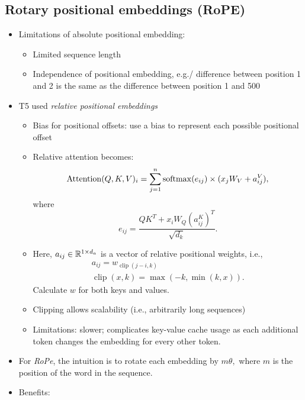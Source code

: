 \subsection{Rotary positional embeddings (RoPE)}
\begin{itemize}
	\item Limitations of absolute positional embedding:
	\begin{itemize}
		\item Limited sequence length
		\item Independence of positional embedding, e.g./ difference between position 1 and 2 is the same as the difference between position 1 and 500
	\end{itemize}
    \item T5 used \textit{relative positional embeddings}
    \begin{itemize}
        \item Bias for positional offsets: use a bias to represent each possible positional offset
        \item Relative attention becomes:
        \begin{equation*}
            \operatorname{Attention}(Q,K,V)_i = \sum_{j=1}^{n}\operatorname{softmax}(e_{ij}) \times (x_jW_V + a_{ij}^V),
        \end{equation*}
        where
        \begin{equation*}
            e_{ij} = \frac{QK^T + x_iW_Q(a_{ij}^K)^T}{\sqrt{d_k}}.
        \end{equation*}
        \item Here, $a_{ij} \in \mathbb{R}^{1\times d_a}$ is a vector of relative positional weights, i.e.,
        \begin{gather*}
            a_{ij} = w_{\operatorname{clip}(j-i,k)}\\
            \operatorname{clip}(x,k) = \max(-k, \min(k,x)).
        \end{gather*}
        Calculate $w$ for both keys and values.
        \item Clipping allows scalability (i.e., arbitrarily long sequences)
        \item Limitations: slower; complicates key-value cache usage as each additional token changes the embedding for every other token.
    \end{itemize}
    \item For \textit{RoPe}, the intuition is to rotate each embedding by $m \theta,$ where $m$ is the position of the word in the sequence.
    \item Benefits:
        \begin{itemize}

\end{itemize}
\end{itemize}
